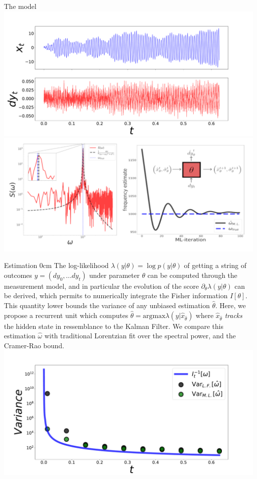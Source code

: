 \documentclass[xcolor={table}]{beamer}
\begin{document}
\begin{frame}[fragile=singleslide,t]
\begin{columns}[onlytextwidth,T]
\begin{column}{.47\textwidth}
\begin{block}{The model}
{\center
  \includegraphics[width=.45\hsize]{figures_poster/evolution.pdf}
  \includegraphics[width=.5\hsize]{figures_poster/dos.pdf}}
\end{block}

\begin{block}{Estimation}
   0cm \dimexpr\linewidth-0cm\relax
  The log-likelihood $\lambda(y|\theta) = \log p(y|\theta)$ of getting a string of outcomes $y= (dy_0, ... dy_t)$ under parameter $\theta$ can be computed through the measurement model, and in particular the evolution of the score $\partial_\theta \lambda(y|\theta)$ can be derived, which permits to numerically integrate the Fisher information $I[\theta]$. This quantity lower bounds the variance of any unbiased estimation $\hat{\theta}$. Here, we propose a recurrent unit which computes $\hat{\theta} = \text{argmax}\lambda(y|\hat{x}_{\hat{\theta}})$ where $\hat{x}_{\hat{\theta}}$
  \textit{tracks} the hidden state in ressemblance to the Kalman Filter. We compare this estimation  $\hat{\omega}$ with traditional Lorentzian fit over the spectral power, and the Cramer-Rao bound.
{\center
    \includegraphics[width=1.\hsize]{figures_poster/variance_comparison_hori.pdf}
}
\end{block}
\end{column}


\end{columns}
\end{frame}
\end{document}
